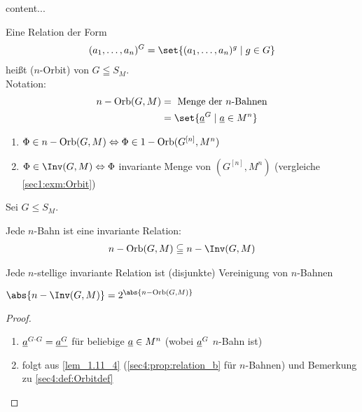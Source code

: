 \begin{*erinnerung}[Hüllenoperator]
	content... %
\end{*erinnerung}
\begin{definition}
	\label{sec4:def:Orbitdef}
	Eine Relation der Form\begin{align*}
		(a_1,\dots, a_n)^G = \set{(a_1, \dots, a_n)^g \mid g \in G}
	\end{align*}
	heißt  ($n$-Orbit) von $G \leqq S_M$.\\
	Notation:
	\begin{align*}
		n-\Orb(G,M) &= \text{ Menge der $n$-Bahnen}\\
		&= \set{\ul{a}^G \mid \ul{a} \in M^n}
	\end{align*}
\end{definition}
\begin{*remark}
	\begin{enumerate}
		\item $\Phi \in n-\operatorname{Orb}(G,M) \Leftrightarrow \Phi \in 1-\operatorname{Orb}(G^{[n]},M^n)$
		\item $\Phi \in \Inv(G,M) \equival \Phi$ invariante Menge von $(G^{[n]},M^n)$ (vergleiche \cref{sec1:exm:Orbit})
	\end{enumerate}
\end{*remark}
\begin{proposition}
	Sei $G \le S_M$.
	\begin{propenum}
		\item Jede $n$-Bahn ist eine invariante Relation:
		\begin{align*}
			n-\Orb(G,M) \subseteqq n-\Inv(G,M)
		\end{align*}\label{sec4:prop:relation_a}
		\item Jede $n$-stellige invariante Relation ist (disjunkte) Vereinigung von $n$-Bahnen \label{sec4:prop:relation_b}
		\item $\abs{n-\Inv (G,M)} = 2^{\abs{n-\Orb(G,M)}}$ \label{sec4:prop:relation_c}
	\end{propenum}
\end{proposition}
\begin{proof}
	\begin{enumerate}
		\item $\underline{a}^{G \cdot G} = \underline{a^G}$ für beliebige $\underline{a} \in M^n$ (wobei $\underline{a}^G$ $n$-Bahn ist)
		\item folgt aus \cref{lem_1.11_4} (\cref{sec4:prop:relation_b} für $n$-Bahnen) und Bemerkung zu \cref{sec4:def:Orbitdef}
	\end{enumerate}
\end{proof}
